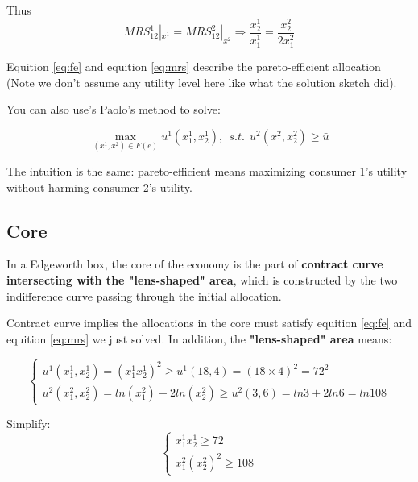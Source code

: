 \documentclass{article}
\begin{document}
Thus 
\begin{equation}
MRS^1_{12} |_{x^1} = MRS^2_{12}|_{x^2} \Rightarrow
\frac{x^1_2}{x^1_1} = \frac{x^2_2}{2x^2_1}
\label{eq:mrs}
\end{equation}

Equition \ref{eq:fe} and equition \ref{eq:mrs} describe the pareto-efficient allocation (Note we don't assume any utility level here like what the solution sketch did).

\begin{mdframed}[backgroundcolor=blue!20,linecolor=white]
You can also use's Paolo's method to solve:

$$\max_{(x^1,x^2) \in F(e)} u^1(x^1_1,x^1_2), \ \ s.t. \ \ u^2(x^2_1,x^2_2) \ge \bar{u}$$

The intuition is the same: pareto-efficient means maximizing consumer 1's utility without harming consumer 2's utility.

\end{mdframed}

\subsection{Core}
In a Edgeworth box, the core of the economy is the
part of \textbf{contract curve intersecting with the "lens-shaped" area}, which is constructed by the two indifference curve passing through the initial allocation.

\vspace{2mm}

Contract curve implies the allocations in the core must satisfy
equition \ref{eq:fe} and equition \ref{eq:mrs} we just solved.
In addition, the \textbf{"lens-shaped" area} means:

\begin{equation}
    \begin{cases}
u^1(x^1_1,x^1_2) = (x^1_1 x^1_2)^2 \ge u^1(18,4) = (18 \times 4)^2=72^2 \\
u^2(x^2_1,x^2_2) = ln(x^2_1) + 2ln(x^2_2) \ge u^2(3,6)=ln3 +2ln6 =ln108
    \end{cases}
    \nonumber
\end{equation}

Simplify:
\begin{equation}
    \begin{cases}
x^1_1 x^1_2 \ge 72 \\
x^2_1 (x^2_2)^2 \ge 108
    \end{cases}
\label{eq:lens}
\end{equation}
\end{document}
